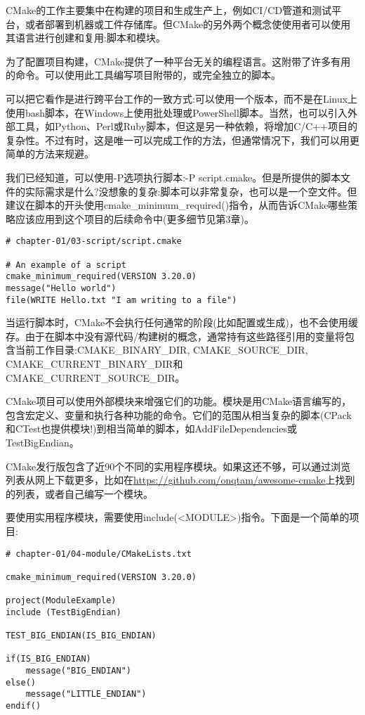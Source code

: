 
CMake的工作主要集中在构建的项目和生成生产上，例如CI/CD管道和测试平台，或者部署到机器或工件存储库。但CMake的另外两个概念使使用者可以使用其语言进行创建和复用:脚本和模块。


为了配置项目构建，CMake提供了一种平台无关的编程语言。这附带了许多有用的命令。可以使用此工具编写项目附带的，或完全独立的脚本。
 
可以把它看作是进行跨平台工作的一致方式:可以使用一个版本，而不是在Linux上使用bash脚本，在Windows上使用批处理或PowerShell脚本。当然，也可以引入外部工具，如Python、Perl或Ruby脚本，但这是另一种依赖，将增加C/C++项目的复杂性。不过有时，这是唯一可以完成工作的方法，但通常情况下，我们可以用更简单的方法来规避。

我们已经知道，可以使用-P选项执行脚本:-P script.cmake。但是所提供的脚本文件的实际需求是什么?没想象的复杂:脚本可以非常复杂，也可以是一个空文件。但建议在脚本的开头使用cmake\_minimum\_required()指令，从而告诉CMake哪些策略应该应用到这个项目的后续命令中(更多细节见第3章)。

\begin{lstlisting}[style=styleCMake]	
# chapter-01/03-script/script.cmake
	
# An example of a script
cmake_minimum_required(VERSION 3.20.0)
message("Hello world")
file(WRITE Hello.txt "I am writing to a file")
\end{lstlisting}

当运行脚本时，CMake不会执行任何通常的阶段(比如配置或生成)，也不会使用缓存。由于在脚本中没有源代码/构建树的概念，通常持有这些路径引用的变量将包含当前工作目录:CMAKE\_BINARY\_DIR, CMAKE\_SOURCE\_DIR, CMAKE\_CURRENT\_BINARY\_DIR和CMAKE\_CURRENT\_SOURCE\_DIR。


CMake项目可以使用外部模块来增强它们的功能。模块是用CMake语言编写的，包含宏定义、变量和执行各种功能的命令。它们的范围从相当复杂的脚本(CPack和CTest也提供模块!)到相当简单的脚本，如AddFileDependencies或TestBigEndian。

CMake发行版包含了近90个不同的实用程序模块。如果这还不够，可以通过浏览列表从网上下载更多，比如在\url{https://github.com/onqtam/awesome-cmake}上找到的列表，或者自己编写一个模块。

要使用实用程序模块，需要使用include(<MODULE>)指令。下面是一个简单的项目:

\begin{lstlisting}[style=styleCMake]	
# chapter-01/04-module/CMakeLists.txt
	
cmake_minimum_required(VERSION 3.20.0)

project(ModuleExample)
include (TestBigEndian)

TEST_BIG_ENDIAN(IS_BIG_ENDIAN)

if(IS_BIG_ENDIAN)
	message("BIG_ENDIAN")
else()
	message("LITTLE_ENDIAN")
endif()
\end{lstlisting}

